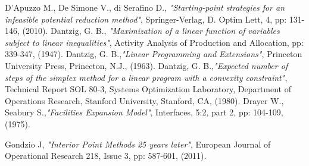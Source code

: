 \documentclass[a4paper,10 pt,titlepage,twoside]{book}
\theoremstyle{plain}
\theoremstyle{definition}
\theoremstyle{remark}
\begin{document}
{{\begin{thebibliography}{9}
	 D'Apuzzo M., De Simone V., di Serafino D., \emph{"Starting-point strategies for an infeasible potential reduction method"}, Springer-Verlag, D. Optim Lett, 4, pp: 131-146, (2010).
	Dantzig, G. B., \emph{"Maximization of a linear function of variables subject to linear
	inequalities"}, Activity Analysis of Production and Allocation, pp: 339-347, (1947).
	Dantzig, G. B.,\emph{\;"Linear Programming and Extensions"}, Princeton University Press, Princeton, N.J., (1963).	
	Dantzig, G. B.,\emph{\;"Expected number of steps of the simplex method for a linear program with a convexity constraint"}, Technical Report SOL 80-3, Systems Optimization Laboratory, Department of Operations Research, Stanford University, Stanford, CA, (1980).
	Drayer W., Seabury S.,\emph{\;"Facilities Expansion Model"}, Interfaces, 5:2, part 2, pp: 104-109, (1975).
	
	
	 Gondzio J, \textit{ "Interior Point Methods 25 years later"}, European Journal of Operational Research 218, Issue 3, pp: 587-601, (2011).	
	

\end{thebibliography}}}
\end{document}
